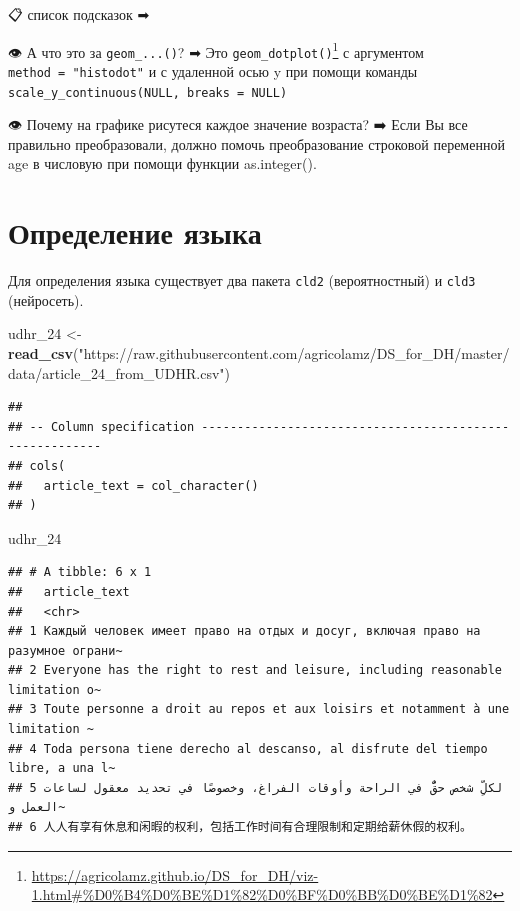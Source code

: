 \documentclass[
]{book}
\newenvironment{Shaded}{\begin{snugshade}}{\end{snugshade}}
\newcommand{\DecValTok}[1]{\textcolor[rgb]{0.00,0.00,0.81}{#1}}
\newcommand{\KeywordTok}[1]{\textcolor[rgb]{0.13,0.29,0.53}{\textbf{#1}}}
\newcommand{\NormalTok}[1]{#1}
\newcommand{\StringTok}[1]{\textcolor[rgb]{0.31,0.60,0.02}{#1}}
\renewcommand{\href}[2]{#2\footnote{\url{#1}}}
\begin{document}
📋 список подсказок ➡

👁 А что это за \texttt{geom\_...()}? ➡
Это \href{https://agricolamz.github.io/DS_for_DH/viz-1.html\#\%D0\%B4\%D0\%BE\%D1\%82\%D0\%BF\%D0\%BB\%D0\%BE\%D1\%82}{\texttt{geom\_dotplot()}} с аргументом \texttt{method\ =\ "histodot"} и с удаленной осью y при помощи команды \texttt{scale\_y\_continuous(NULL,\ breaks\ =\ NULL)}

👁 Почему на графике рисутеся каждое значение возраста? ➡
Если Вы все правильно преобразовали, должно помочь преобразование строковой переменной age в числовую при помощи функции as.integer().

\hypertarget{ux43eux43fux440ux435ux434ux435ux43bux435ux43dux438ux435-ux44fux437ux44bux43aux430}{%
\section{Определение языка}\label{ux43eux43fux440ux435ux434ux435ux43bux435ux43dux438ux435-ux44fux437ux44bux43aux430}}

Для определения языка существует два пакета \texttt{cld2} (вероятностный) и \texttt{cld3} (нейросеть).

\begin{Shaded}
\begin{Highlighting}[]
\NormalTok{udhr_}\DecValTok{24}\NormalTok{ <-}\StringTok{ }\KeywordTok{read_csv}\NormalTok{(}\StringTok{"https://raw.githubusercontent.com/agricolamz/DS_for_DH/master/data/article_24_from_UDHR.csv"}\NormalTok{)}
\end{Highlighting}
\end{Shaded}

\begin{verbatim}
## 
## -- Column specification --------------------------------------------------------
## cols(
##   article_text = col_character()
## )
\end{verbatim}

\begin{Shaded}
\begin{Highlighting}[]
\NormalTok{udhr_}\DecValTok{24}
\end{Highlighting}
\end{Shaded}

\begin{verbatim}
## # A tibble: 6 x 1
##   article_text                                                                  
##   <chr>                                                                         
## 1 Каждый человек имеет право на отдых и досуг, включая право на разумное ограни~
## 2 Everyone has the right to rest and leisure, including reasonable limitation o~
## 3 Toute personne a droit au repos et aux loisirs et notamment à une limitation ~
## 4 Toda persona tiene derecho al descanso, al disfrute del tiempo libre, a una l~
## 5 لكلِّ شخص حقٌّ في الراحة وأوقات الفراغ، وخصوصًا في تحديد معقول لساعات العمل و~     
## 6 人人有享有休息和闲暇的权利，包括工作时间有合理限制和定期给薪休假的权利。
\end{verbatim}
\end{document}
